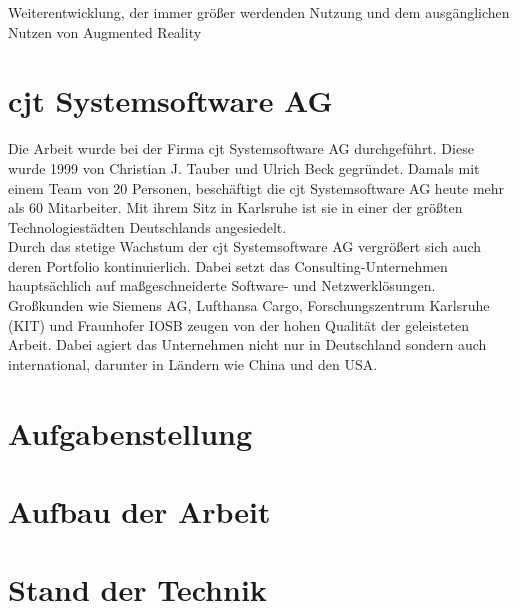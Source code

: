 Weiterentwicklung, der immer größer werdenden Nutzung und dem ausgänglichen Nutzen von Augmented Reality 


\section{cjt Systemsoftware AG}
Die Arbeit wurde bei der Firma cjt Systemsoftware AG durchgeführt. Diese wurde
1999 von Christian J. Tauber und Ulrich Beck gegründet. Damals mit einem Team
von 20 Personen, beschäftigt die cjt Systemsoftware AG heute mehr als 60 Mitarbeiter. 
Mit ihrem Sitz in Karlsruhe ist sie in einer der größten Technologiestädten Deutschlands angesiedelt.
\\
\linebreak
Durch das stetige Wachstum der cjt Systemsoftware AG vergrößert sich auch deren
Portfolio kontinuierlich. Dabei setzt das Consulting-Unternehmen hauptsächlich auf maßgeschneiderte
Software- und Netzwerklösungen. Großkunden wie Siemens AG, Lufthansa Cargo,
Forschungszentrum Karlsruhe (KIT) und Fraunhofer IOSB zeugen von der hohen Qualität der geleisteten Arbeit. 
Dabei agiert das Unternehmen nicht nur in Deutschland sondern auch international, darunter in Ländern wie China und den USA.

\section{Aufgabenstellung}
\section{Aufbau der Arbeit}
\section{Stand der Technik}
